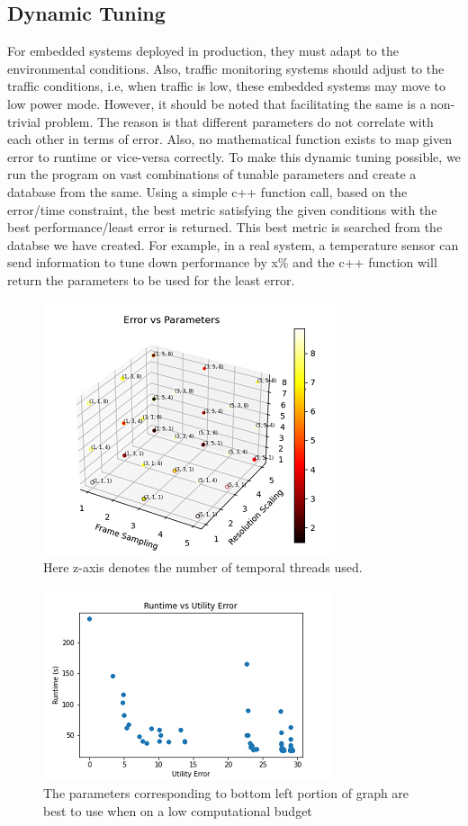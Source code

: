 \documentclass[conference]{IEEEtran}
\begin{document}
\subsection{Dynamic Tuning}

For embedded systems deployed in production, they must adapt to the environmental conditions. Also, traffic monitoring systems should adjust to the traffic conditions,
i.e, when traffic is low, these embedded systems may move to low power mode. 
However, it should be noted that facilitating the same is a non-trivial problem. The reason is that different parameters do not correlate with each other in terms of error. Also, no mathematical function exists to map given error to runtime or vice-versa correctly.
To make this dynamic tuning possible, we run the program on vast combinations of tunable parameters and create a database from the same.
Using a simple c++ function call, based on the error/time constraint, the best metric satisfying the given conditions with the best performance/least error is returned. This best metric is searched from the databse we have created. For example, in a real system, a temperature sensor can send information to tune down performance by x\% and 
the c++ function will return the parameters to be used for the least error.

\begin{figure}[htbp]
\centerline{\includegraphics{plots/Error_vs_Params.png}}
\caption{Here z-axis denotes the number of temporal threads used.}
\label{ca_evp} 
\end{figure}
    
\begin{figure}[htbp]
\centerline{\includegraphics{plots/CompleteAnalysis_rVe.png}}
\caption{The parameters corresponding to bottom left portion of graph are best to use when on a low computational budget}
\label{ca_rve} 
\end{figure}
    
\end{document}
